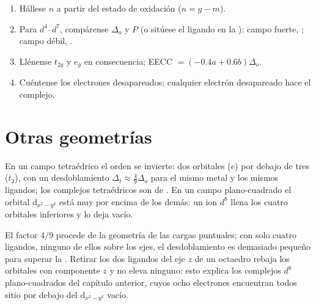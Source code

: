 \begin{method}\label{met:b2:ligand-field:spin-state}
\begin{enumerate}
  \item Hállese $n$ a partir del estado de oxidación ($n = g - m$).
  \item Para $d^4$--$d^7$, compárense $\Delta_o$ y $P$ (o sitúese el ligando en la
        ): campo fuerte, ; campo débil, .
  \item Llénense $t_{2g}$ y $e_g$ en consecuencia; EECC $= (-0.4a + 0.6b)\Delta_o$.
  \item Cuéntense los electrones desapareados; cualquier electrón desapareado hace
         el complejo.
\end{enumerate}
\end{method}

\section{Otras geometrías}

\begin{proposition}\label{prop:b2:ligand-field:tetrahedral}
En un campo tetraédrico el orden se invierte: dos orbitales ($e$) por debajo de tres ($t_2$),
con un desdoblamiento $\Delta_t \approx \frac49\Delta_o$ para el mismo metal y los mismos ligandos; los complejos
tetraédricos son de . En un campo plano-cuadrado el orbital $\mathrm d_{x^2-y^2}$ está muy
por encima de los demás: un ion $d^8$ llena los cuatro orbitales inferiores y lo deja vacío.
\end{proposition}

\admitted

El factor $4/9$ procede de la geometría de las cargas puntuales; con solo cuatro ligandos,
ninguno de ellos sobre los ejes, el desdoblamiento es demasiado pequeño para superar la . Retirar los dos ligandos del eje $z$ de un octaedro rebaja los orbitales con
componente $z$ y no eleva ninguno: esto explica los complejos $d^8$ plano-cuadrados del
capítulo anterior, cuyos ocho electrones encuentran todos sitio por debajo del
$\mathrm d_{x^2-y^2}$ vacío.


